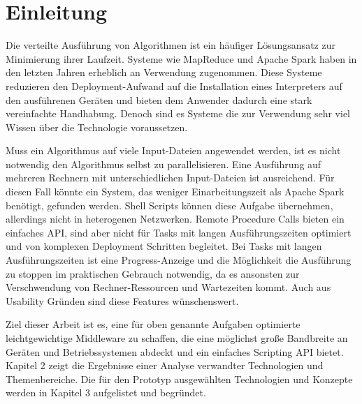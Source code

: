 
\chapter{Einleitung}


Die verteilte Ausführung von Algorithmen ist ein häufiger Lösungsansatz zur Minimierung ihrer Laufzeit.
Systeme wie MapReduce und Apache Spark haben in den letzten Jahren erheblich an Verwendung zugenommen.
Diese Systeme reduzieren den Deployment-Aufwand auf die Installation eines Interpreters auf den ausführenen Geräten und bieten dem Anwender dadurch eine stark vereinfachte Handhabung.
Denoch sind es Systeme die zur Verwendung sehr viel Wissen über die Technologie voraussetzen.

Muss ein Algorithmus auf viele Input-Dateien angewendet werden, ist es nicht notwendig den Algorithmus selbst zu parallelisieren.
Eine Ausführung auf mehreren Rechnern mit unterschiedlichen Input-Dateien ist ausreichend.
Für diesen Fall könnte ein System, das weniger Einarbeitungszeit als Apache Spark benötigt, gefunden werden.
Shell Scripts können diese Aufgabe übernehmen, allerdings nicht in heterogenen Netzwerken.
Remote Procedure Calls bieten ein einfaches API, sind aber nicht für Tasks mit langen Ausführungszeiten optimiert und von komplexen Deployment Schritten begleitet.
Bei Tasks mit langen Ausführungszeiten ist eine Progress-Anzeige und die Möglichkeit die Ausführung zu stoppen im praktischen Gebrauch notwendig, da es ansonsten zur Verschwendung von Rechner-Ressourcen und Wartezeiten kommt.
Auch aus Usability Gründen sind diese Features wünschenswert.

Ziel dieser Arbeit ist es, eine für oben genannte Aufgaben optimierte leichtgewichtige Middleware zu schaffen, die eine möglichst große Bandbreite an Geräten und Betriebssystemen abdeckt und ein einfaches Scripting API bietet.
Kapitel 2 zeigt die Ergebnisse einer Analyse verwandter Technologien und Themenbereiche.
Die für den Prototyp ausgewählten Technologien und Konzepte werden in Kapitel 3 aufgelistet und begründet.

